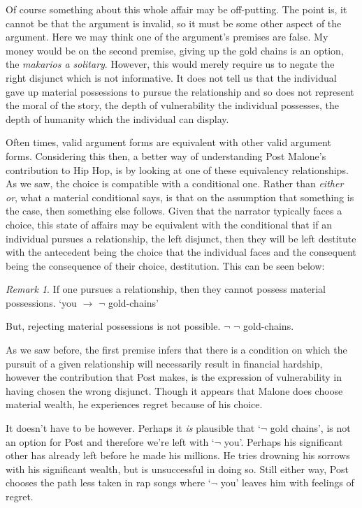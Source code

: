 \documentclass[phdthesis,12pt,final]{wuthesis}
\theoremstyle{definition}
\theoremstyle{definition}
\theoremstyle{definition}
\theoremstyle{definition}
\theoremstyle{remark}
\newtheorem*{remark}{Remark}
\begin{document}
Of course something about this whole affair may be off-putting. The point is, it cannot be that the argument is invalid, so it must be some other aspect of the argument. Here we may think one of the argument's premises are false. My money would be on the second premise, giving up the gold chains is an option, the \emph{makarios a solitary}. However, this would merely require us to negate the right disjunct which is not informative. It does not tell us that the individual gave up material possessions to pursue the relationship and so does not represent the moral of the story, the depth of vulnerability the individual possesses, the depth of humanity which the individual can display.

Often times, valid argument forms are equivalent with other valid argument forms. Considering this then, a better way of understanding Post Malone's contribution to Hip Hop, is by looking at one of these equivalency relationships. As we saw, the choice is compatible with a conditional one. Rather than \emph{either or}, what a material conditional says, is that on the assumption that something is the case, then something else follows. Given that the narrator typically faces a choice, this state of affairs may be equivalent with the conditional that if an individual pursues a relationship, the left disjunct, then they will be left destitute with the antecedent being the choice that the individual faces and the consequent being the consequence of their choice, destitution. This can be seen below:

\begin{remark}
If one pursues a relationship, then they cannot possess material possessions. `you \(\rightarrow\) \(\lnot\) gold-chains'
\end{remark}

But, rejecting material possessions is not possible. \(\lnot\) \(\lnot\) gold-chains.

As we saw before, the first premise infers that there is a condition on which the pursuit of a given relationship will necessarily result in financial hardship, however the contribution that Post makes, is the expression of vulnerability in having chosen the wrong disjunct. Though it appears that Malone does choose material wealth, he experiences regret because of his choice.

It doesn't have to be however. Perhaps it \emph{is} plausible that `\(\lnot\) gold chains', is not an option for Post and therefore we're left with `\(\lnot\) you'. Perhaps his significant other has already left before he made his millions. He tries drowning his sorrows with his significant wealth, but is unsuccessful in doing so. Still either way, Post chooses the path less taken in rap songs where `\(\lnot\) you' leaves him with feelings of regret.
\end{document}
